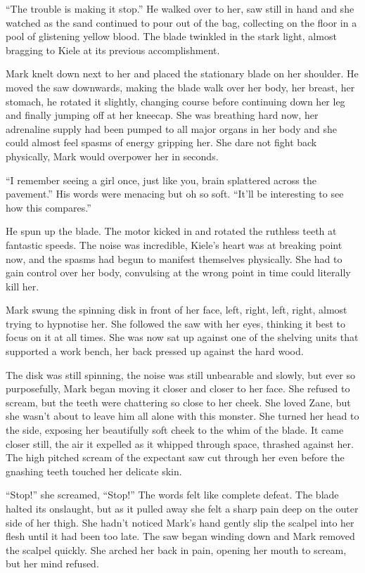 ``The trouble is making it stop.''  He walked over to her, saw still in hand and she watched as the sand continued to pour out of the bag, collecting on the floor in a pool of glistening yellow blood.  The blade twinkled in the stark light, almost bragging to Kiele at its previous accomplishment.

Mark knelt down next to her and placed the stationary blade on her shoulder.  He moved the saw downwards, making the blade walk over her body, her breast, her stomach, he rotated it slightly, changing course before continuing down her leg and finally jumping off at her kneecap.  She was breathing hard now, her adrenaline supply had been pumped to all major organs in her body and she could almost feel spasms of energy gripping her.  She dare not fight back physically, Mark would overpower her in seconds.

``I remember seeing a girl once, just like you, brain splattered across the pavement.''  His words were menacing but oh so soft.  ``It'll be interesting to see how this compares.''

He spun up the blade.  The motor kicked in and rotated the ruthless teeth at fantastic speeds.  The noise was incredible, Kiele's heart was at breaking point now, and the spasms had begun to manifest themselves physically.  She had to gain control over her body, convulsing at the wrong point in time could literally kill her.

Mark swung the spinning disk in front of her face, left, right, left, right, almost trying to hypnotise her.  She followed the saw with her eyes, thinking it best to focus on it at all times.  She was now sat up against one of the shelving units that supported a work bench, her back pressed up against the hard wood.

The disk was still spinning, the noise was still unbearable and slowly, but ever so purposefully, Mark began moving it closer and closer to her face.  She refused to scream, but the teeth were chattering so close to her cheek.  She loved Zane, but she wasn't about to leave him all alone with this monster.  She turned her head to the side, exposing her beautifully soft cheek to the whim of the blade.  It came closer still, the air it expelled as it whipped through space, thrashed against her.  The high pitched scream of the expectant saw cut through her even before the gnashing teeth touched her delicate skin.

``Stop!'' she screamed, ``Stop!''  The words felt like complete defeat.  The blade halted its onslaught, but as it pulled away she felt a sharp pain deep on the outer side of her thigh.  She hadn't noticed Mark's hand gently slip the scalpel into her flesh until it had been too late.  The saw began winding down and Mark removed the scalpel quickly.  She arched her back in pain, opening her mouth to scream, but her mind refused.  

